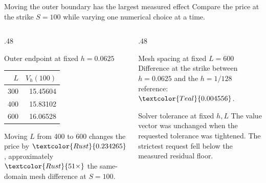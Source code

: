 \documentclass[aspectratio=169,11pt]{beamer}
\begin{document}
\begin{frame}[t]{Moving the outer boundary has the largest measured effect}
\small
Compare the price at the strike \(S=100\) while varying one numerical choice at a time.

\begin{columns}[T,onlytextwidth]
\begin{column}{.48\textwidth}
\begin{block}{Outer endpoint at fixed \(h=0.0625\)}
\centering
\begin{tabular}{@{}rr@{}}
\toprule
\(L\) & \(V_h(100)\) \\
\midrule
300 & 15.45604 \\
400 & 15.83102 \\
600 & 16.06528 \\
\bottomrule
\end{tabular}
\end{block}
\footnotesize
Moving \(L\) from 400 to 600 changes the price by
\(\textcolor{Rust}{0.234265}\), approximately
\(\textcolor{Rust}{51\times}\) the same-domain mesh difference at \(S=100\).
\end{column}
\begin{column}{.48\textwidth}
\begin{block}{Mesh spacing at fixed \(L=600\)}
\footnotesize
Difference at the strike between \(h=0.0625\) and the \(h=1/128\) reference:
\(\textcolor{Teal}{0.004556}\).
\end{block}
\begin{block}{Solver tolerance at fixed \(h,L\)}
\footnotesize
The value vector was unchanged when the requested tolerance was tightened.
The strictest request fell below the measured residual floor.
\end{block}
\end{column}
\end{columns}

\end{frame}
\end{document}
